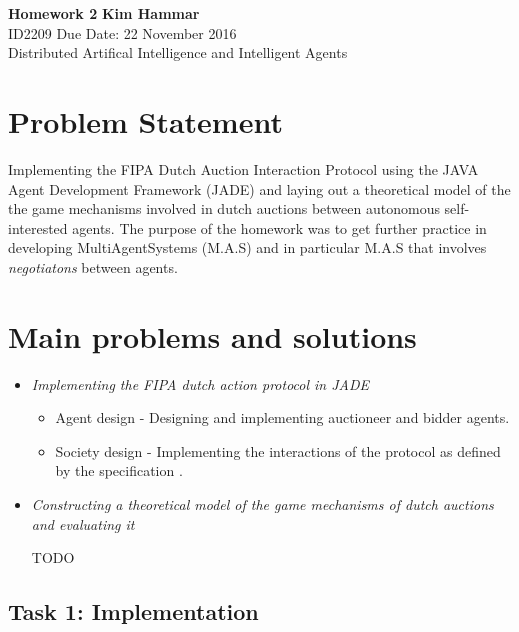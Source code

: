 \documentclass[a4paper, 11pt]{article}
\begin{document}
\noindent
\large\textbf{Homework 2} \hfill \textbf{Kim Hammar} \\
\normalsize ID2209 \hfill Due Date: 22 November 2016 \\
Distributed Artifical Intelligence and Intelligent Agents \hfill \\

\section*{Problem Statement}
Implementing the FIPA Dutch Auction Interaction Protocol \citep{fipa_dutch} using the JAVA Agent Development Framework (JADE) \citep{jade} and laying out a theoretical model of the the game mechanisms involved in dutch auctions between autonomous self-interested agents. The purpose of the homework was to get further practice in developing MultiAgentSystems (M.A.S) and in particular M.A.S that involves \textit{negotiatons} between agents.

\section*{Main problems and solutions}
\begin{itemize}
\item \textit{Implementing the FIPA dutch action protocol in JADE}
\begin{itemize}
\item Agent design - Designing and implementing auctioneer and bidder agents.
\item Society design - Implementing  the interactions of the protocol as defined by the specification \citep{fipa_dutch}.
\end{itemize}
\item \textit{Constructing a theoretical model of the game mechanisms of dutch auctions and evaluating it}

TODO
\end{itemize}

\subsection*{Task 1: Implementation}
\end{document}
